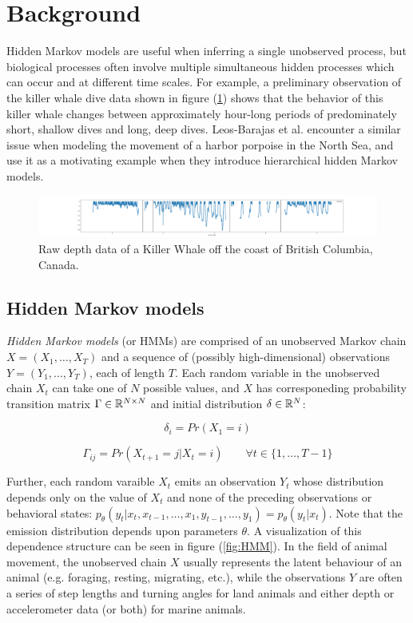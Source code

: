 
\section{Background}

Hidden Markov models are useful when inferring a single unobserved process, but biological processes often involve multiple simultaneous hidden processes which can occur and at different time scales. For example, a preliminary observation of the killer whale dive data shown in figure (\ref{fig:data}) shows that the behavior of this killer whale changes between approximately hour-long periods of predominately short, shallow dives and long, deep dives. Leos-Barajas et al. encounter a similar issue when modeling the movement of a harbor porpoise in the North Sea, and use it as a motivating example when they introduce hierarchical hidden Markov models.

\begin{figure}[h!]
	\centering
	\includegraphics[width=6.5in]{../Plots/raw_data.png}
	\caption{Raw depth data of a Killer Whale off the coast of British Columbia, Canada.}
	\label{fig:data}
\end{figure}

\subsection{Hidden Markov models}

\textit{Hidden Markov models} (or HMMs) are comprised of an unobserved Markov chain $X = (X_1, \ldots, X_T)$ and a sequence of (possibly high-dimensional) observations $Y = (Y_1, \ldots, Y_T)$, each of length $T$. Each random variable in the unobserved chain $X_t$ can take one of $N$ possible values, and $X$ has corresponeding probability transition matrix $\Gamma \in \mathbb{R}^{N \times N}$ and initial distribution $\delta \in \mathbb{R}^N$:

$$\delta_i = Pr(X_1 = i)$$

$$ \Gamma_{ij} = Pr(X_{t+1} = j | X_t = i) \qquad \forall t \in \{ 1, \ldots, T-1\} $$

Further, each random varaible $X_t$ emits an observation $Y_t$ whose distribution depends only on the value of $X_t$ and none of the preceding observations or behavioral states: $p_{\theta}(y_t|x_t, x_{t-1}, \ldots , x_1, y_{t-1}, \ldots , y_1) = p_{\theta}(y_t|x_t)$. Note that the emission distribution depends upon parameters $\theta$. A visualization of this dependence structure can be seen in figure (\ref{fig:HMM}). In the field of animal movement, the unobserved chain $X$ usually represents the latent behaviour of an animal (e.g. foraging, resting, migrating, etc.), while the observations $Y$ are often a series of step lengths and turning angles for land animals and either depth or accelerometer data (or both) for marine animals.

